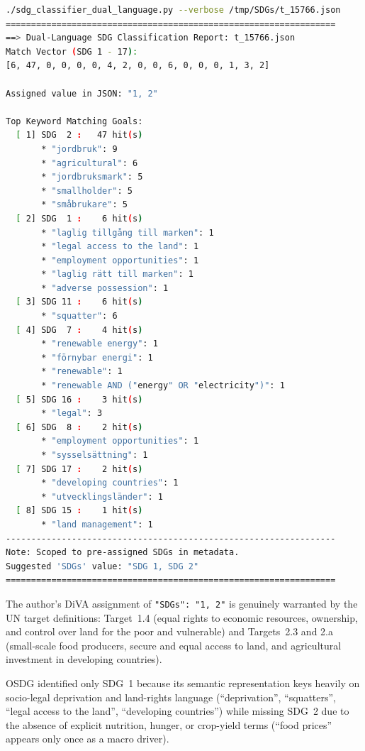 \begin{casestudySection}
\begin{lstlisting}[language={bash}, basicstyle=\footnotesize, escapechar=|, breaklines=true,
    postbreak=\usebox{\lstbreakbox}, caption={Program's output}, label=lst:t_15766Output]
./sdg_classifier_dual_language.py --verbose /tmp/SDGs/t_15766.json
=================================================================
==> Dual-Language SDG Classification Report: t_15766.json
Match Vector (SDG 1 - 17):
[6, 47, 0, 0, 0, 0, 4, 2, 0, 0, 6, 0, 0, 0, 1, 3, 2]

Assigned value in JSON: "1, 2"

Top Keyword Matching Goals:
  [ 1] SDG  2 :   47 hit(s)
       * "jordbruk": 9
       * "agricultural": 6
       * "jordbruksmark": 5
       * "smallholder": 5
       * "småbrukare": 5
  [ 2] SDG  1 :    6 hit(s)
       * "laglig tillgång till marken": 1
       * "legal access to the land": 1
       * "employment opportunities": 1
       * "laglig rätt till marken": 1
       * "adverse possession": 1
  [ 3] SDG 11 :    6 hit(s)
       * "squatter": 6
  [ 4] SDG  7 :    4 hit(s)
       * "renewable energy": 1
       * "förnybar energi": 1
       * "renewable": 1
       * "renewable AND ("energy" OR "electricity")": 1
  [ 5] SDG 16 :    3 hit(s)
       * "legal": 3
  [ 6] SDG  8 :    2 hit(s)
       * "employment opportunities": 1
       * "sysselsättning": 1
  [ 7] SDG 17 :    2 hit(s)
       * "developing countries": 1
       * "utvecklingsländer": 1
  [ 8] SDG 15 :    1 hit(s)
       * "land management": 1
-----------------------------------------------------------------
Note: Scoped to pre-assigned SDGs in metadata.
Suggested 'SDGs' value: "SDG 1, SDG 2"
=================================================================
\end{lstlisting}

The author's \gls{DiVA} assignment of \texttt{"SDGs": "1, 2"} is genuinely warranted by the \gls{UN} target definitions: Target~1.4 (equal rights to economic resources, ownership, and control over land for the poor and vulnerable) and Targets~2.3 and 2.a (small-scale food producers, secure and equal access to land, and agricultural investment in developing countries).

OSDG identified only \gls{SDG}~1 because its semantic representation keys heavily on socio-legal deprivation and land-rights language (\enquote{deprivation}, \enquote{squatters}, \enquote{legal access to the land}, \enquote{developing countries}) while missing \gls{SDG}~2 due to the absence of explicit nutrition, hunger, or crop-yield terms (\enquote{food prices} appears only once as a macro driver).


\end{casestudySection}
